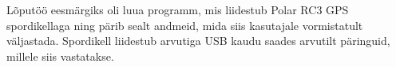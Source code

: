 %
%
%
%
%
%
%

Lõputöö eesmärgiks oli luua programm, mis liidestub Polar RC3 GPS spordikellaga ning pärib sealt andmeid, mida siis kasutajale vormistatult väljastada. 
Spordikell liidestub arvutiga USB kaudu saades arvutilt päringuid, millele siis vastatakse.\cite{example-reference}
